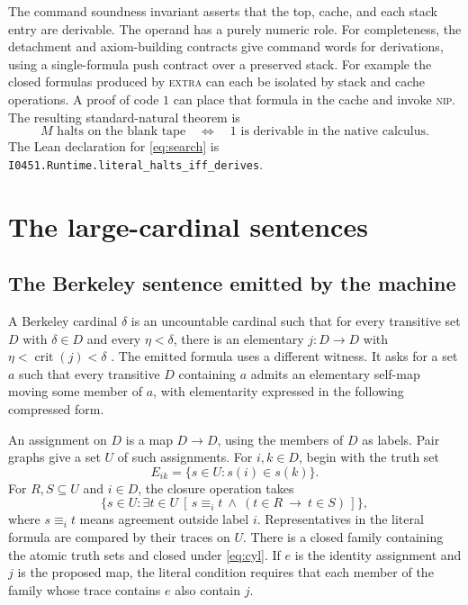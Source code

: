 \documentclass[11pt,letterpaper]{article}
\theoremstyle{definition}
\newcommand{\file}[1]{\texttt{\nolinkurl{#1}}}
\begin{document}
The command soundness invariant asserts that the top, cache, and
each stack entry are derivable. The operand has a purely numeric
role. For completeness, the detachment and axiom-building contracts
give command words for derivations, using a single-formula push
contract over a preserved stack. For example the closed formulas
produced by \textsc{extra} can each be isolated by stack and cache
operations. A proof of code $1$ can place that formula in the cache
and invoke \textsc{nip}. The resulting standard-natural theorem is
\begin{equation}\label{eq:search}
  M\text{ halts on the blank tape}
  \quad\Longleftrightarrow\quad
  1\text{ is derivable in the native calculus}.
\end{equation}
The Lean declaration for \eqref{eq:search} is
\file{I0451.Runtime.literal_halts_iff_derives}.

\section{The large-cardinal sentences}\label{sec:large}

\subsection{The Berkeley sentence emitted by the machine}

A Berkeley cardinal $\delta$ is an uncountable cardinal such that
for every transitive set $D$ with $\delta\in D$ and every $\eta<\delta$,
there is an elementary $j:D\to D$ with
$\eta<\operatorname{crit}(j)<\delta$ \cite{bkw}. The emitted formula
uses a different witness. It asks for a set $a$ such that every
transitive $D$ containing $a$ admits an elementary self-map moving
some member of $a$, with elementarity expressed in the following
compressed form.

An assignment on $D$ is a map $D\to D$, using the members of $D$
as labels. Pair graphs give a set $U$ of such assignments. For
$i,k\in D$, begin with the truth set
\[
 E_{ik}=\{s\in U:s(i)\in s(k)\}.
\]
For $R,S\subseteq U$ and $i\in D$, the closure operation takes
\begin{equation}\label{eq:cyl}
  \{s\in U:\exists t\in U\
       [\,s\equiv_i t\ \land\ (t\in R\ \longrightarrow\ t\in S)\,]\},
\end{equation}
where $s\equiv_i t$ means agreement outside label $i$. Representatives
in the literal formula are compared by their traces on $U$.
There is a closed family containing the atomic truth sets and
closed under \eqref{eq:cyl}. If $e$ is the identity assignment and
$j$ is the proposed map, the literal condition requires that each
member of the family whose trace contains $e$ also contain $j$.
\end{document}
